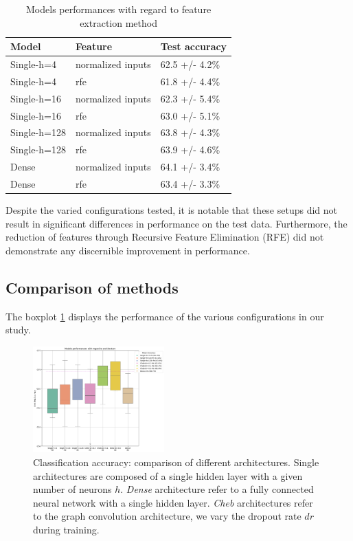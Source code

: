 \begin{table}
	\begin{center}
		\begin{tabular}{lll}
			Model & Feature & Test accuracy \\
			\hline
			Single-h=4 & normalized inputs & 62.5 +/- 4.2\% \\
			Single-h=4 & rfe & 61.8 +/- 4.4\% \\
			Single-h=16 & normalized inputs & 62.3 +/- 5.4\% \\
			Single-h=16 & rfe & 63.0 +/- 5.1\% \\
			Single-h=128 & normalized inputs & 63.8 +/- 4.3\% \\
			Single-h=128 & rfe & 63.9 +/- 4.6\% \\
			Dense & normalized inputs & 64.1 +/- 3.4\% \\
			Dense & rfe & 63.4 +/- 3.3\% \\
		\end{tabular}
	\end{center}
	\caption{Models performances with regard to feature extraction method}
	\label{table:dependance_on_feature_extraction_method}
\end{table}

Despite the varied configurations tested, it is notable that these setups did not result in significant differences in performance on the test data. Furthermore, the reduction of features through Recursive Feature Elimination (RFE) did not demonstrate any discernible improvement in performance.

\subsection{Comparison of methods}

The boxplot \ref{fig:results_architecture} displays the performance of the various configurations in our study. 
\begin{figure}[h!]
    \centering
    \includegraphics[width=0.45\textwidth]{figures/model_performances_architecture.png}
    \caption{Classification accuracy: comparison of different architectures.
    Single architectures are composed of a single hidden layer with a given number of neurons $h$.
    \textit{Dense} architecture refer to a fully connected neural network with a single hidden layer.
    \textit{Cheb} architectures refer to the graph convolution architecture, we vary the dropout rate $dr$
    during training.}
    \Description{}
    \label{fig:results_architecture}
\end{figure}

